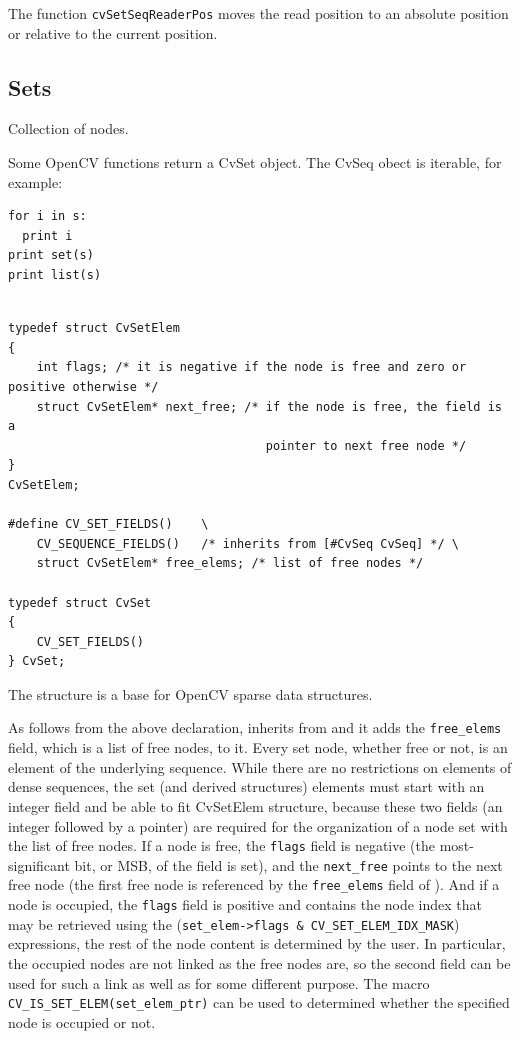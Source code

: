 The function \texttt{cvSetSeqReaderPos} moves the read position to an absolute position or relative to the current position.

\fi

\subsection{Sets}

\label{CvSet}

Collection of nodes.

\ifPython
Some OpenCV functions return a CvSet object. The CvSeq obect is iterable, for example:

\begin{lstlisting}
for i in s:
  print i
print set(s)
print list(s)
\end{lstlisting}
\fi

\ifC
\begin{lstlisting}

typedef struct CvSetElem
{
    int flags; /* it is negative if the node is free and zero or positive otherwise */
    struct CvSetElem* next_free; /* if the node is free, the field is a
                                    pointer to next free node */
}
CvSetElem;

#define CV_SET_FIELDS()    \
    CV_SEQUENCE_FIELDS()   /* inherits from [#CvSeq CvSeq] */ \
    struct CvSetElem* free_elems; /* list of free nodes */

typedef struct CvSet
{
    CV_SET_FIELDS()
} CvSet;

\end{lstlisting}

The structure  is a base for OpenCV sparse data structures.

As follows from the above declaration, \cross{CvSet} inherits from
 and it adds the \texttt{free\_elems} field, which
is a list of free nodes, to it. Every set node, whether free or not, is an
element of the underlying sequence. While there are no restrictions on
elements of dense sequences, the set (and derived structures) elements
must start with an integer field and be able to fit CvSetElem structure,
because these two fields (an integer followed by a pointer) are required
for the organization of a node set with the list of free nodes. If a node is
free, the \texttt{flags} field is negative (the most-significant bit, or
MSB, of the field is set), and the \texttt{next\_free} points to the next
free node (the first free node is referenced by the \texttt{free\_elems}
field of \cross{CvSet}). And if a node is occupied, the \texttt{flags} field
is positive and contains the node index that may be retrieved using the
(\texttt{set\_elem->flags \& CV\_SET\_ELEM\_IDX\_MASK}) expressions, the rest of
the node content is determined by the user. In particular, the occupied
nodes are not linked as the free nodes are, so the second field can be
used for such a link as well as for some different purpose. The macro
\texttt{CV\_IS\_SET\_ELEM(set\_elem\_ptr)} can be used to determined whether
the specified node is occupied or not.

